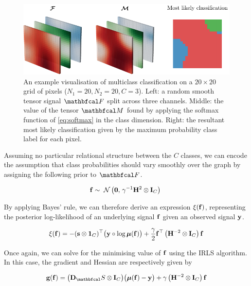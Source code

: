\begin{figure}[t]  
    \begin{center}
        \includegraphics[width=\linewidth]{Figures/multiclass.pdf}
    \end{center}
   \caption[Visualisation of multiclass classification on a 2D lattice]{An example visualisation of multiclass classification on a $20 \times 20$ grid of pixels ($N_1 = 20, N_2 = 20, C=3$). Left: a random smooth tensor signal $\Ft$ split across three channels. Middle: the value of the tensor $\Mt$ found by applying the softmax function of \cref{eq:softmax} in the class dimension. Right: the resultant most likely classification given by the maximum probability class label for each pixel. } 
    \label{fig:logistic_gsr_multiclass}
\end{figure} 


Assuming no particular relational structure between the $C$ classes, we can encode the assumption that class probabilities should vary smoothly over the graph by assigning the following prior to $\Ft$. 

\begin{equation}
    \mathbf{f} \sim \; \mathcal{N}\left(\mathbf{0}, \, \gamma^{-1} \mathbf{H}^2 \otimes \mathbf{I}_C\right) \;
\end{equation}

By applying Bayes' rule, we can therefore derive an expression $\xi(\mathbf{f})$, representing the posterior log-likelihood of an underlying signal $\mathbf{f}$ given an observed signal $\mathbf{y}$. 

\begin{equation*}
    \xi(\mathbf{f}) = - (\mathbf{s} \otimes \mathbf{1}_C)^\top \big(\mathbf{y} \circ \log \boldsymbol{\mu}(\mathbf{f}) \big) + \frac{\gamma}{2} \mathbf{f}^\top \left(\mathbf{H}^{-2} \otimes \mathbf{I}_C\right) \mathbf{f}
\end{equation*}

Once again, we can solve for the minimising value of $\mathbf{f}$ using the IRLS algorithm. In this case, the gradient and Hessian are respectively given by 

\begin{equation}
    \g(\f) = \big(\D_\St \otimes \I_C\big) \big(\muu(\f) - \y\big) + \gamma \left(\HH^{-2} \otimes \I_C\right) \f
\end{equation}

